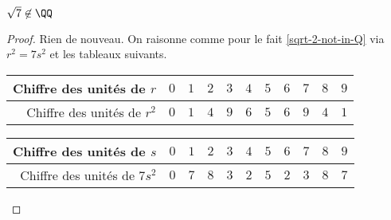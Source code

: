\begin{fact}
	$\sqrt7 \not\in \QQ$
\end{fact}

\begin{proof}
	Rien de nouveau. 
	On raisonne comme pour le fait \ref{sqrt-2-not-in-Q} via $r^2 = 7s^2$ et les tableaux suivants.
	
	\begin{center}
		\begin{tabular}{|r|c|c|c|c|c|c|c|c|c|c|}
			\hline
			Chiffre des unités de $r$
			  & $0$  &  $1$  &  $2$  &  $3$  &  $4$  &  $5$  &  $6$  &  $7$  &  $8$  &  $9$
			\\ \hline
			\phantom{$2$}Chiffre des unités de $r^2$
			  & $0$  &  $1$  &  $4$  &  $9$  &  $6$  &  $5$  &  $6$  &  $9$  &  $4$  &  $1$
			\\ \hline
		\end{tabular}

		\medskip
		
		\begin{tabular}{|r|c|c|c|c|c|c|c|c|c|c|}
			\hline
			Chiffre des unités de $s$
			  & $0$  &  $1$  &  $2$  &  $3$  &  $4$  &  $5$  &  $6$  &  $7$  &  $8$  &  $9$
			\\ \hline
			Chiffre des unités de $7s^2$
			  & $0$  &  $7$  &  $8$  &  $3$  &  $2$  &  $5$  &  $2$  &  $3$  &  $8$  &  $7$
			\\ \hline
		\end{tabular}
	\end{center}
\end{proof}